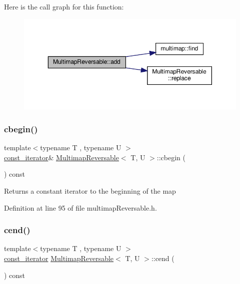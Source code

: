 Here is the call graph for this function\+:\nopagebreak
\begin{figure}[H]
\begin{center}
\leavevmode
\includegraphics[width=350pt]{classMultimapReversable_a6e6c514a5fcd3df9fa0c068075064735_cgraph}
\end{center}
\end{figure}
\mbox{\label{classMultimapReversable_a20b261236b6075cd93e16ab0ec0455c4}} 
\subsubsection{\texorpdfstring{cbegin()}{cbegin()}}
{\footnotesize\ttfamily template$<$typename T , typename U $>$ \\
\hyperlink{classMultimapReversable_ac747a36aa9a030bec3d2149d97047de5}{const\+\_\+iterator}\& \hyperlink{classMultimapReversable}{Multimap\+Reversable}$<$ T, U $>$\+::cbegin (\begin{DoxyParamCaption}{ }\end{DoxyParamCaption}) const\hspace{0.3cm}{\ttfamily [inline]}}

\begin{DoxyReturn}{Returns}
a constant iterator to the beginning of the map 
\end{DoxyReturn}


Definition at line 95 of file multimap\+Reversable.\+h.

\mbox{\label{classMultimapReversable_a61a87bb3d33488b80d46fbbeffa2b91e}} 
\subsubsection{\texorpdfstring{cend()}{cend()}}
{\footnotesize\ttfamily template$<$typename T , typename U $>$ \\
\hyperlink{classMultimapReversable_ac747a36aa9a030bec3d2149d97047de5}{const\+\_\+iterator} \hyperlink{classMultimapReversable}{Multimap\+Reversable}$<$ T, U $>$\+::cend (\begin{DoxyParamCaption}{ }\end{DoxyParamCaption}) const\hspace{0.3cm}{\ttfamily [inline]}}

